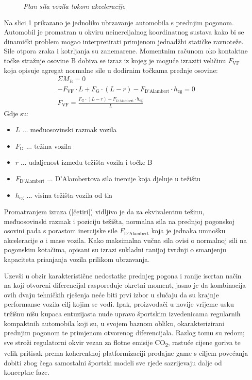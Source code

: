 \documentclass[11pt]{article}
\numberwithin{equation}{section}%
\begin{document}
\begin{figure}
 \centering
 \def\svgwidth{14cm}
 
 \caption{\textit{Plan sila vozila tokom akceleracije}}
 \label{fig:pogon}
\end{figure} 

Na slici \ref{fig:pogon} prikazano je jednoliko ubrzavanje automobila s prednjim pogonom. Automobil je promatran u okviru neinercijalnog koordinatnog sustava kako bi se dinamički problem mogao interpretirati primjenom jednadžbi statičke ravnoteže. Sile otpora zraka i kotrljanja su zanemarene. Momentnim računom oko kontaktne točke stražnje osovine B dobiva se izraz iz kojeg je moguće izraziti veličinu $F_\text{VF}$ koja opisuje agregat normalne sile u dodirnim točkama prednje osovine:
\begin{gather}
\Sigma M_\text{B}=0\\
-F_\text{VF}\cdot L+F_\text{G}\cdot (L-r)-F_\text{D'Alambert}\cdot h_\text{cg}=0\\
F_\text{VF}=\frac{F_\text{G}\cdot (L-r)-F_\text{D'Alambert}\cdot h_\text{cg}}{L} \label{četiri}
\end{gather}
Gdje su:
\begin{itemize}
	\item[]$L$ ... međuosovinski razmak vozila
	\item[]$F_\text{G}$ ... težina vozila
	\item[]$r$ ... udaljenost između težišta vozila i točke B
	\item[]$F_\text{D'Alambert}$ ... D'Alambertova sila inercije koja djeluje u težištu
	\item[]$h_\text{cg}$ ... visina težišta vozila od tla
\end{itemize}
Promatranjem izraza (\ref{četiri}) vidljivo je da za ekvivalentnu težinu, međuosovinski razmak i poziciju težišta, normalna sila na prednjoj pogonskoj osovini pada s porastom inercijske sile $F_\text{D'Alambert}$ koja je jednaka umnošku akceleracije $a$ i mase vozila. Kako maksimalna vučna sila ovisi o normalnoj sili na pogonskim kotačima, opisani su izrazi sukladni ranijoj tvrdnji o smanjenju kapaciteta prianjanja vozila prilikom ubrzavanja.

Uzevši u obzir karakteristične nedostatke prednjeg pogona i ranije iscrtan način na koji otvoreni diferencijal raspoređuje okretni moment, jasno je da kombinacija ovih dvaju tehničkih rješenja neće biti prvi izbor u slučaju da su krajnje performanse vozila cilj kojim se vodi. Ipak, proizvođači u novije vrijeme usku tržišnu nišu kupaca entuzijasta nude upravo športskim izvedenicama regularnih kompaktnih automobila koji su, u svojem baznom obliku, okarakterizirani prednjim pogonom te primjenom otvorenog diferencijala. Razlog tomu su redom; sve stroži regulatorni okvir vezan za flotne emisije CO\textsubscript{2}, rastuće cijene goriva te velik pritisak prema koherentnoj platformizaciji prodajne game s ciljem povećanja dobiti zbog čega samostalni športski modeli sve rjeđe sazrijevaju dalje od konceptne faze.
\end{document}
